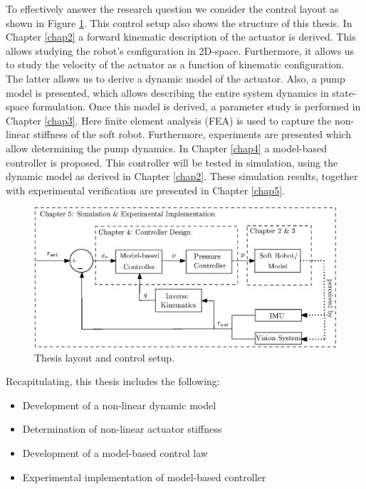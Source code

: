 To effectively answer the research question we consider the control layout as shown in Figure \ref{fig1:controlarchitecture}. This control setup also shows the structure of this thesis. In Chapter \ref{chap2} a forward kinematic description of the actuator is derived. This allows studying the robot's configuration in 2D-space. Furthermore, it allows us to study the velocity of the actuator as a function of kinematic configuration. The latter allows us to derive a dynamic model of the actuator. Also, a pump model is presented, which allows describing the entire system dynamics in state-space formulation. Once this model is derived, a parameter study is performed in Chapter \ref{chap3}. Here finite element analysis (FEA) is used to capture the non-linear stiffness of the soft robot. Furthermore, experiments are presented which allow determining the pump dynamics. In Chapter \ref{chap4} a model-based controller is proposed. This controller will be tested in simulation, using the dynamic model as derived in Chapter \ref{chap2}. These simulation results, together with experimental verification are presented in Chapter \ref{chap5}.




\begin{figure}[H]
    \centering
    \includegraphics[width = \textwidth]{Figures/Chapter1/controlschemeCompleteGood.eps}
    \caption{Thesis layout and control setup.}
    \label{fig1:controlarchitecture}
\end{figure}


Recapitulating, this thesis includes the following:


\begin{itemize}
    \item Development of a non-linear dynamic model
    \item Determination of non-linear actuator stiffness
    \item Development of a model-based control law
    \item Experimental implementation of model-based controller
\end{itemize}


